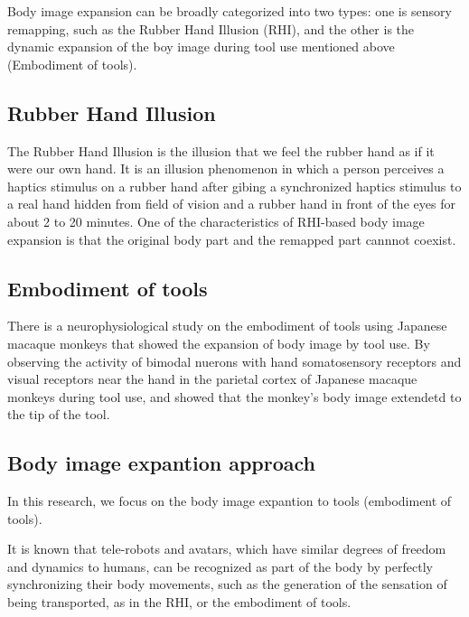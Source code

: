 \documentclass[letterpaper, 10 pt, conference]{ieeeconf}  %
\begin{document}
                Body image expansion can be broadly categorized into two types: one is sensory remapping, such as the Rubber Hand Illusion (RHI), and the other is the dynamic expansion of the boy image during tool use mentioned above (Embodiment of tools).  

        \subsection{Rubber Hand Illusion}
                The Rubber Hand Illusion is the illusion that we feel the rubber hand as if it were our own hand.  
                It is an illusion phenomenon in which a person perceives a haptics stimulus on a rubber hand after gibing a synchronized haptics stimulus to a real hand hidden from field of vision and a rubber hand in front of the eyes for about 2 to 20 minutes.  
                One of the characteristics of RHI-based body image expansion is that the original body part and the remapped part cannnot coexist.

        \subsection{Embodiment of tools}
                There is a neurophysiological study on the embodiment of tools using Japanese macaque monkeys that showed the expansion of body image by tool use.  
                By observing the activity of bimodal nuerons with hand somatosensory receptors and visual receptors near the hand in the parietal cortex of Japanese macaque monkeys during tool use, and showed that the monkey's body image extendetd to the tip of the tool.

        \subsection{Body image expantion approach}
                In this research, we focus on the body image expantion to tools (embodiment of tools).

                It is known that tele-robots and avatars, which have similar degrees of freedom and dynamics to humans, can be recognized as part of the body by perfectly synchronizing their body movements, such as the generation of the sensation of being transported, as in the RHI, or the embodiment of tools.
                
\end{document}
